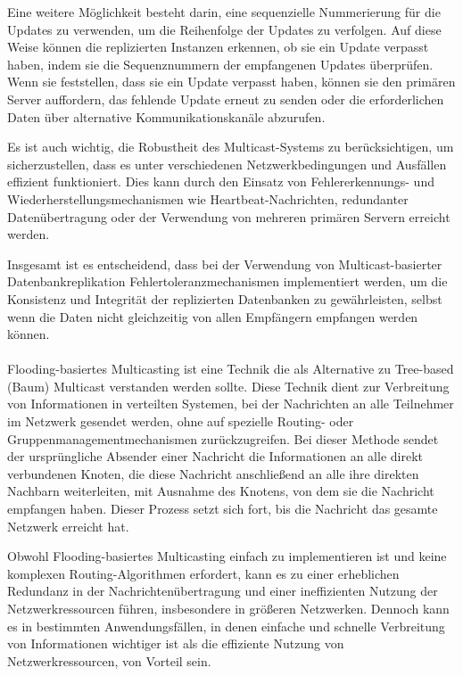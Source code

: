 \documentclass[../vs-script-first-v01.tex]{subfiles}
\begin{document}
Eine weitere Möglichkeit besteht darin, eine sequenzielle Nummerierung für die Updates zu verwenden, um die Reihenfolge der Updates zu verfolgen. Auf diese Weise können die replizierten Instanzen erkennen, ob sie ein Update verpasst haben, indem sie die Sequenznummern der empfangenen Updates überprüfen. Wenn sie feststellen, dass sie ein Update verpasst haben, können sie den primären Server auffordern, das fehlende Update erneut zu senden oder die erforderlichen Daten über alternative Kommunikationskanäle abzurufen.

Es ist auch wichtig, die Robustheit des Multicast-Systems zu berücksichtigen, um sicherzustellen, dass es unter verschiedenen Netzwerkbedingungen und Ausfällen effizient funktioniert. Dies kann durch den Einsatz von Fehlererkennungs- und Wiederherstellungsmechanismen wie Heartbeat-Nachrichten, redundanter Datenübertragung oder der Verwendung von mehreren primären Servern erreicht werden.

Insgesamt ist es entscheidend, dass bei der Verwendung von Multicast-basierter Datenbankreplikation Fehlertoleranzmechanismen implementiert werden, um die Konsistenz und Integrität der replizierten Datenbanken zu gewährleisten, selbst wenn die Daten nicht gleichzeitig von allen Empfängern empfangen werden können.
\\\\
Flooding-basiertes Multicasting ist eine Technik die als Alternative zu Tree-based (Baum) Multicast verstanden werden sollte. Diese Technik dient zur Verbreitung von Informationen in verteilten Systemen, bei der Nachrichten an alle Teilnehmer im Netzwerk gesendet werden, ohne auf spezielle Routing- oder Gruppenmanagementmechanismen zurückzugreifen. Bei dieser Methode sendet der ursprüngliche Absender einer Nachricht die Informationen an alle direkt verbundenen Knoten, die diese Nachricht anschließend an alle ihre direkten Nachbarn weiterleiten, mit Ausnahme des Knotens, von dem sie die Nachricht empfangen haben. Dieser Prozess setzt sich fort, bis die Nachricht das gesamte Netzwerk erreicht hat.

Obwohl Flooding-basiertes Multicasting einfach zu implementieren ist und keine komplexen Routing-Algorithmen erfordert, kann es zu einer erheblichen Redundanz in der Nachrichtenübertragung und einer ineffizienten Nutzung der Netzwerkressourcen führen, insbesondere in größeren Netzwerken. Dennoch kann es in bestimmten Anwendungsfällen, in denen einfache und schnelle Verbreitung von Informationen wichtiger ist als die effiziente Nutzung von Netzwerkressourcen, von Vorteil sein.
\end{document}
